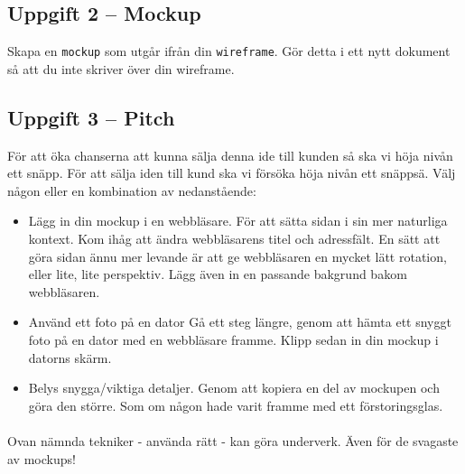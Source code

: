 \documentclass{article}
\begin{document}
    \subsection*{Uppgift 2 -- Mockup}
    Skapa en \texttt{mockup} som utgår ifrån din \texttt{wireframe}. Gör detta i ett nytt dokument så att du inte skriver över din wireframe.

    \subsection*{Uppgift 3 -- Pitch}
    För att öka chanserna att kunna sälja denna ide till kunden så ska vi höja nivån ett snäpp. För att sälja iden till kund ska vi försöka höja nivån ett snäppsä. Välj någon eller en kombination av nedanstående:
      \begin{itemize}
        \item{Lägg in din mockup i en webbläsare. }
        För att sätta sidan i sin mer naturliga kontext. Kom ihåg att ändra webbläsarens titel och adressfält. En sätt att göra sidan ännu mer levande är att ge webbläsaren en mycket lätt rotation, eller lite, lite perspektiv. Lägg även in en passande bakgrund bakom webbläsaren.
        \item{ Använd ett foto på en dator }
        Gå ett steg längre, genom att hämta ett snyggt foto på en dator med en webbläsare framme. Klipp sedan in din mockup i datorns skärm.
        \item {Belys snygga/viktiga detaljer. }
        Genom att kopiera en del av mockupen och göra den större. Som om någon hade varit framme med ett förstoringsglas.
      \end{itemize}

      \paragraph{}
      Ovan nämnda tekniker - använda rätt - kan göra underverk. Även för de svagaste av mockups!
\end{document}
